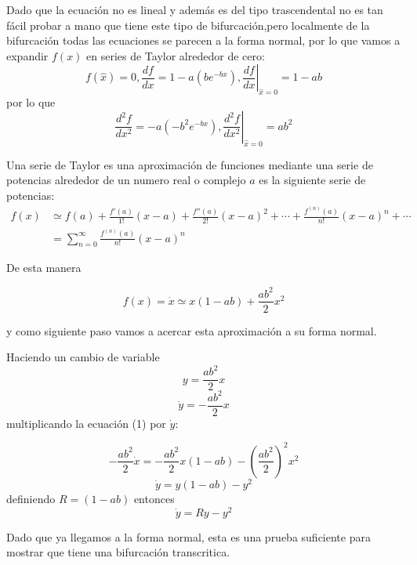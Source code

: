 Dado que la ecuación no es lineal y además es del tipo trascendental no es tan fácil probar a mano que tiene este tipo de bifurcación,pero localmente de la bifurcación todas las ecuaciones se parecen a la forma normal, por lo que vamos a expandir $f(x)$ en series de Taylor alrededor de cero:
$$
f( \hat{x} )=0, \frac{df}{dx}=1-a(be^{-bx}), \left. \frac{df}{dx} \right|_{\hat{x}=0} =1-ab
$$
por lo que
$$
\frac{d^2f}{dx^2}=-a(-b^2e^{-bx}), \left. \frac{d^2f}{dx^2} \right|_{\hat{x}=0} = ab^2
$$
  \begin{tcolorbox}[colback=Black!4, colframe=White, arc=2mm]
  \begin{recordatorio}
    Una serie de Taylor es una aproximación de funciones mediante una serie de potencias alrededor de un numero real o complejo $a$ es la siguiente serie de potencias:
$$
\begin{aligned}
  \label{eq:}
  f(x) &\simeq f(a)+\frac{f'(a)}{1!}(x-a)+\frac{f''(a)}{2!}(x-a)^2 + \cdots + \frac{f^{(n)}(a)}{n!}(x-a)^{n}+ \cdots \\ &= \sum_{n=0}^{\infty} \frac{f^{(n)}(a)}{n!}(x-a)^{n}
\end{aligned}
$$   
  \end{recordatorio}
\end{tcolorbox}

De esta manera

\begin{equation}
  f(x) = \dot{x}  \simeq x(1-ab)+\frac{ab^2}{2}x^2
\end{equation}

y como siguiente paso vamos a acercar esta aproximación a su forma normal. 

Haciendo un cambio de variable
$$
y=\frac{ab^2}{2}x
$$
$$
\dot{y}=-\frac{ab^2}{2}x 
$$
multiplicando la ecuación (1) por $ \dot{y}$:

$$
-\frac{ab^2}{2} \dot{x}=-\frac{ab^2}{2}x(1-ab) - \left( \frac{ab^2}{2} \right) ^2x^2
$$
$$
\dot{y}=y(1-ab)-y^2 
$$
definiendo $R=(1-ab)$
entonces
 \begin{equation}
  \dot{y}=Ry-y^2 
\end{equation}

\begin{tcolorbox}[colback=Black!4, colframe=White, arc=2mm]
\begin{nota}
Dado que ya llegamos a la forma normal, esta es una prueba suficiente para mostrar que tiene una bifurcación transcritica. 
\end{nota}
\end{tcolorbox}

